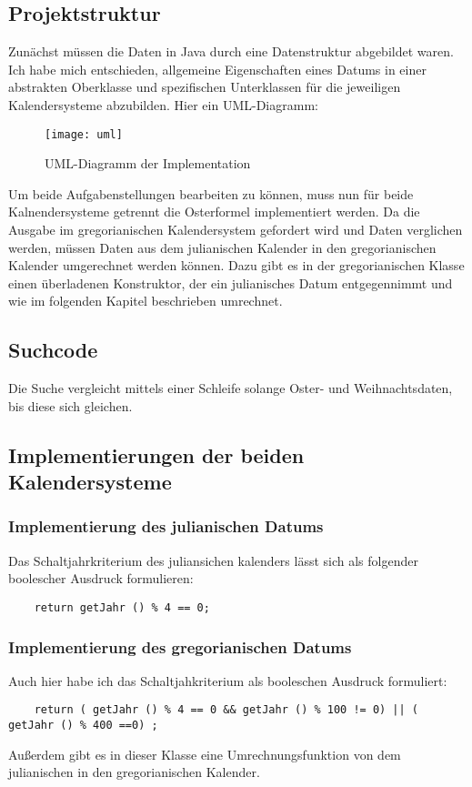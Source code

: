 \subsection{Projektstruktur}
Zunächst müssen die Daten in Java durch eine Datenstruktur abgebildet waren. Ich habe mich entschieden, allgemeine Eigenschaften eines Datums in einer abstrakten Oberklasse und spezifischen Unterklassen für die jeweiligen Kalendersysteme abzubilden. Hier ein UML-Diagramm:
\begin{figure}[h]
	\centering
	\texttt{[image: uml]}
	\caption{UML-Diagramm der Implementation}
\end{figure}

Um beide Aufgabenstellungen bearbeiten zu können, muss nun für beide Kalnendersysteme getrennt die Osterformel implementiert werden. Da die Ausgabe im gregorianischen Kalendersystem gefordert wird und Daten verglichen werden, müssen Daten aus dem julianischen Kalender in den gregorianischen Kalender umgerechnet werden können. Dazu gibt es in der gregorianischen Klasse einen überladenen Konstruktor, der ein julianisches Datum entgegennimmt und wie im folgenden Kapitel beschrieben umrechnet.

\subsection{Suchcode}
Die Suche vergleicht mittels einer Schleife solange Oster- und Weihnachtsdaten, bis diese sich gleichen.
\clearpage
\subsection{Implementierungen der beiden Kalendersysteme}
	\subsubsection{Implementierung des julianischen Datums}
	Das Schaltjahrkriterium des juliansichen kalenders lässt sich als folgender boolescher Ausdruck formulieren:
	\begin{lstlisting}
	return getJahr () % 4 == 0;
	\end{lstlisting}
	\subsubsection{Implementierung des gregorianischen Datums}
	Auch hier habe ich das Schaltjahkriterium als booleschen Ausdruck formuliert:
	\begin{lstlisting}
	return ( getJahr () % 4 == 0 && getJahr () % 100 != 0) || ( getJahr () % 400 ==0) ;
	\end{lstlisting}
	Außerdem gibt es in dieser Klasse eine Umrechnungsfunktion von dem julianischen in den gregorianischen Kalender. 

